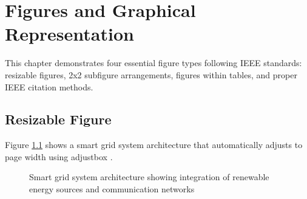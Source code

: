 
\chapter{Figures and Graphical Representation}
\label{chap:figures}

This chapter demonstrates four essential figure types following IEEE standards: resizable figures, 2x2 subfigure arrangements, figures within tables, and proper IEEE citation methods.

\section{Resizable Figure}
\label{sec:resizable_figure}

Figure \ref{fig:smart_grid_architecture} shows a smart grid system architecture that automatically adjusts to page width using adjustbox \cite{farhangi2010smart}.

\begin{figure}[htbp]
	\centering
	\caption{Smart grid system architecture showing integration of renewable energy sources and communication networks}
	\label{fig:smart_grid_architecture}
\end{figure}


